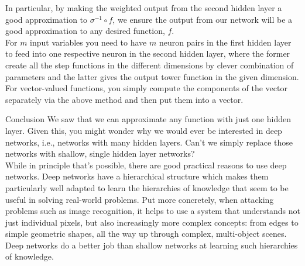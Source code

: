 In particular, by making the weighted output from the second hidden layer a good approximation to $\sigma^{-1}\circ f$, we ensure the output from our network will be a good approximation to any desired function, $f$.\\
For $m$ input variables you need to have $m$ neuron pairs in the first hidden layer to feed into one respective neuron in the second hidden layer, where the former create all the step functions in the different dimensions by clever combination of parameters and the latter gives the output tower function in the given dimension.\\
For vector-valued functions, you simply compute the components of the vector separately via the above method and then put them into a vector.
\begin{mybox}{Conclusion}
We saw that we can approximate any function with just one hidden layer. Given this, you might wonder why we would ever be interested in deep networks, i.e., networks with many hidden layers. Can't we simply replace those networks with shallow, single hidden layer networks?\\
While in principle that's possible, there are good practical reasons to use deep networks. Deep networks have a hierarchical structure which makes them particularly well adapted to learn the hierarchies of knowledge that seem to be useful in solving real-world problems. Put more concretely, when attacking problems such as image recognition, it helps to use a system that understands not just individual pixels, but also increasingly more complex concepts: from edges to simple geometric shapes, all the way up through complex, multi-object scenes. Deep networks do a better job than shallow networks at learning such hierarchies of knowledge.
\end{mybox}









